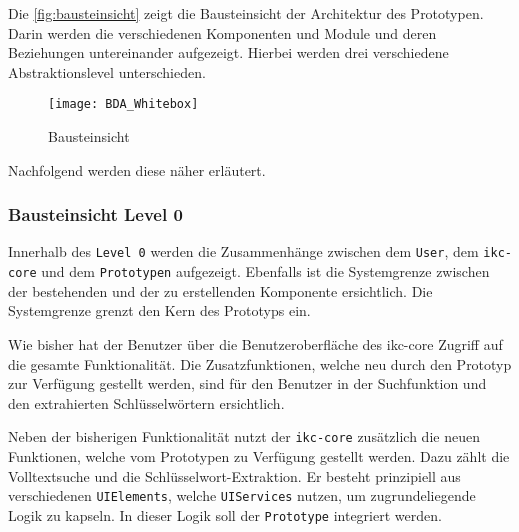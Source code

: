 Die \autoref{fig:bausteinsicht} zeigt die Bausteinsicht der Architektur des Prototypen. Darin werden die verschiedenen Komponenten und Module und deren Beziehungen untereinander aufgezeigt. Hierbei werden drei verschiedene Abstraktionslevel unterschieden. 

\begin{figure}[H]
\centering
\texttt{[image: BDA\_Whitebox]}
\caption{Bausteinsicht}
\label{fig:bausteinsicht}
\end{figure}

Nachfolgend werden diese näher erläutert.



\subsubsection{Bausteinsicht Level 0}


Innerhalb des \texttt{Level 0} werden die Zusammenhänge zwischen dem \texttt{User}, dem \texttt{ikc-core} und dem \texttt{Prototypen} aufgezeigt. Ebenfalls ist die Systemgrenze zwischen der bestehenden und der zu erstellenden Komponente ersichtlich. Die Systemgrenze grenzt den Kern des Prototyps ein.




Wie bisher hat der Benutzer über die Benutzeroberfläche des \gls{ikc-core} Zugriff auf die gesamte Funktionalität. Die Zusatzfunktionen, welche neu durch den Prototyp zur Verfügung gestellt werden, sind für den Benutzer in der Suchfunktion und den extrahierten Schlüsselwörtern ersichtlich.





Neben der bisherigen Funktionalität nutzt der \texttt{ikc-core} zusätzlich die neuen Funktionen, welche vom Prototypen zu Verfügung gestellt werden. Dazu zählt die Volltextsuche und die Schlüs\-sel\-wort-\-Ex\-trak\-tion. Er besteht prinzipiell aus verschiedenen \texttt{UI\-Ele\-ments}, welche \texttt{UI\-Ser\-vices} nutzen, um zugrundeliegende Logik zu kapseln. In dieser Logik soll der \texttt{Prototype} integriert werden.


